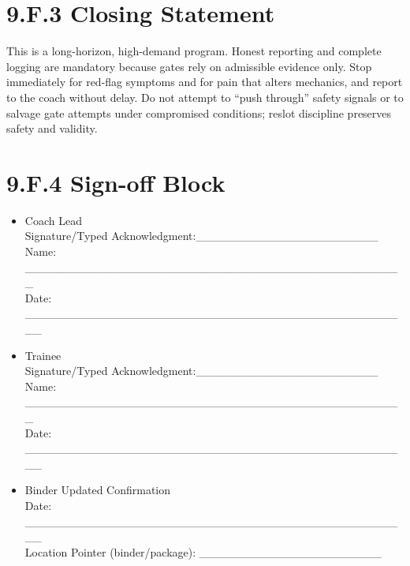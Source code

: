 \documentclass[10pt]{article}
\begin{document}
\endgroup

\section*{9.F.3 Closing Statement}
{}

This is a long-horizon, high-demand program. Honest reporting and complete logging are mandatory because gates rely on admissible evidence only. Stop immediately for red-flag symptoms and for pain that alters mechanics, and report to the coach without delay. Do not attempt to “push through” safety signals or to salvage gate attempts under compromised conditions; reslot discipline preserves safety and validity.

\section*{9.F.4 Sign-off Block}
{}

\begin{itemize}
\item Coach Lead \\
Signature/Typed Acknowledgment:\_\_\_\_\_\_\_\_\_\_\_\_\_\_\_\_\_\_\_\_\_\_\\
Name: \_\_\_\_\_\_\_\_\_\_\_\_\_\_\_\_\_\_\_\_\_\_\_\_\_\_\_\_\_\_\_\_\_\_\_\_\_\_\_\_\_\_\_\_\_\_   \\
Date: \_\_\_\_\_\_\_\_\_\_\_\_\_\_\_\_\_\_\_\_\_\_\_\_\_\_\_\_\_\_\_\_\_\_\_\_\_\_\_\_\_\_\_\_\_\_\_
\item Trainee \\
Signature/Typed Acknowledgment:\_\_\_\_\_\_\_\_\_\_\_\_\_\_\_\_\_\_\_\_\_\_\\
Name: \_\_\_\_\_\_\_\_\_\_\_\_\_\_\_\_\_\_\_\_\_\_\_\_\_\_\_\_\_\_\_\_\_\_\_\_\_\_\_\_\_\_\_\_\_\_   \\
Date: \_\_\_\_\_\_\_\_\_\_\_\_\_\_\_\_\_\_\_\_\_\_\_\_\_\_\_\_\_\_\_\_\_\_\_\_\_\_\_\_\_\_\_\_\_\_\_
\item Binder Updated Confirmation \\
Date: \_\_\_\_\_\_\_\_\_\_\_\_\_\_\_\_\_\_\_\_\_\_\_\_\_\_\_\_\_\_\_\_\_\_\_\_\_\_\_\_\_\_\_\_\_\_\_ \\
Location Pointer (binder/package): \_\_\_\_\_\_\_\_\_\_\_\_\_\_\_\_\_\_\_\_\_\_
\end{itemize}
\end{document}
